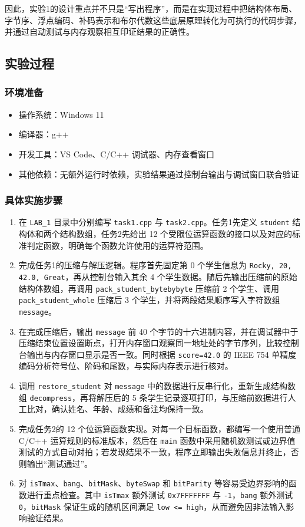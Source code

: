 \documentclass[supercite]{Experimental_Report}
\theoremstyle{definition}
\begin{document}
因此，实验1的设计重点并不只是“写出程序”，而是在实现过程中把结构体布局、字节序、浮点编码、补码表示和布尔代数这些底层原理转化为可执行的代码步骤，并通过自动测试与内存观察相互印证结果的正确性。

\subsection{实验过程}

\subsubsection{环境准备}
\begin{itemize}
  \item 操作系统：Windows 11
  \item 编译器：g++
  \item 开发工具：VS Code、C/C++ 调试器、内存查看窗口
  \item 其他依赖：无额外运行时依赖，实验结果通过控制台输出与调试窗口联合验证
\end{itemize}

\subsubsection{具体实施步骤}
\begin{enumerate}
  \item 在 \texttt{LAB\_1} 目录中分别编写 \texttt{task1.cpp} 与 \texttt{task2.cpp}。任务1先定义 \texttt{student} 结构体和两个结构数组，任务2先给出 12 个受限位运算函数的接口以及对应的标准判定函数，明确每个函数允许使用的运算符范围。
  \item 完成任务1的压缩与解压逻辑。程序首先固定第 0 个学生信息为 \texttt{Rocky, 20, 42.0, Great}，再从控制台输入其余 4 个学生数据。随后先输出压缩前的原始结构体数组，再调用 \texttt{pack\_student\_bytebybyte} 压缩前 2 个学生、调用 \texttt{pack\_student\_whole} 压缩后 3 个学生，并将两段结果顺序写入字符数组 \texttt{message}。
  \item 在完成压缩后，输出 \texttt{message} 前 40 个字节的十六进制内容，并在调试器中于压缩结束位置设置断点，打开内存窗口观察同一地址处的字节序列，比较控制台输出与内存窗口显示是否一致。同时根据 \texttt{score=42.0} 的 IEEE 754 单精度编码分析符号位、阶码和尾数，与实际内存表示进行核对。
  \item 调用 \texttt{restore\_student} 对 \texttt{message} 中的数据进行反串行化，重新生成结构数组 \texttt{decompress}，再将解压后的 5 条学生记录逐项打印，与压缩前数据进行人工比对，确认姓名、年龄、成绩和备注均保持一致。
  \item 完成任务2的 12 个位运算函数实现。对每一个目标函数，都编写一个使用普通 C/C++ 运算规则的标准版本，然后在 \texttt{main} 函数中采用随机数测试或边界值测试的方式自动对拍；若发现结果不一致，程序立即输出失败信息并终止，否则输出“测试通过”。
  \item 对 \texttt{isTmax}、\texttt{bang}、\texttt{bitMask}、\texttt{byteSwap} 和 \texttt{bitParity} 等容易受边界影响的函数进行重点检查。其中 \texttt{isTmax} 额外测试 \texttt{0x7FFFFFFF} 与 \texttt{-1}，\texttt{bang} 额外测试 \texttt{0}，\texttt{bitMask} 保证生成的随机区间满足 \texttt{low <= high}，从而避免因非法输入影响验证结果。
\end{enumerate}
\end{document}
